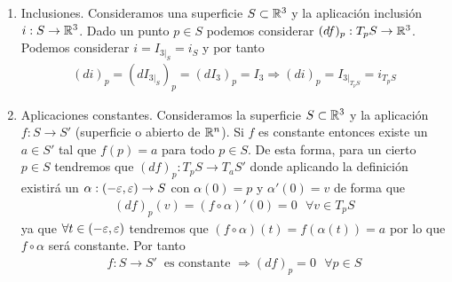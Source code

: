 \begin{ejemplo}
\begin{enumerate}
        \item Inclusiones. Consideramos una superficie $S\subset \mathbb{R}^3$ y la aplicación inclusión $i:S \to \mathbb{R}^3$. Dado un punto $p\in S$ podemos considerar $(df)_p : T_pS \to \mathbb{R}^3$. Podemos considerar $i=I_{3|_S}=i_S$ y por tanto
        \begin{gather*}
            (di)_p = (dI_{3|_S})_p = (dI_3)_p = I_3 \Rightarrow (di)_p = I_{3|_{T_pS}} = i_{T_pS}
        \end{gather*}

        \item Aplicaciones constantes. Consideramos la superficie $S\subset \mathbb{R}^3$ y la aplicación $f:S\to S'$ (superficie o abierto de $\mathbb{R}^n$). Si $f$ es constante entonces existe un $a\in S'$ tal que $f(p)=a$ para todo $p\in S$. De esta forma, para un cierto $p\in S$ tendremos que $(df)_p : T_pS \to T_aS'$ donde aplicando la definición existirá un $\alpha:(-\varepsilon, \varepsilon) \to S$ con $\alpha(0)=p$ y $\alpha'(0)=v$ de forma que
        \begin{gather*}
            (df)_p(v) = (f\circ \alpha)'(0) = 0 \ \ \ \forall v\in T_pS
        \end{gather*}
        ya que $\forall t \in (-\varepsilon, \varepsilon)$ tendremos que $(f\circ \alpha)(t) = f(\alpha(t)) = a$ por lo que $f\circ \alpha$ será constante. Por tanto 
        \begin{gather*}
            f:S \to S' \ \text{ es constante } \Rightarrow (df)_p = 0 \ \ \ \forall p \in S
        \end{gather*}
    \end{enumerate}
\end{ejemplo}

